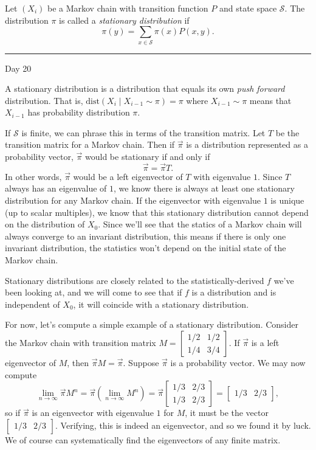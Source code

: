 \documentclass{problemset}
\newcommand{\mat}[1]{\begin{bmatrix}#1\end{bmatrix}}
\newcommand{\1}{\mathbf{1}}
\newcommand{\fatrule}[1]{\vspace{.3cm}\hrule {\hfill \sf #1}\par}
\begin{document}
	\begin{definition}
		Let $(X_i)$ be a Markov chain with transition function $P$ and state space $\mathcal S$.  The distribution $\pi$
		is called a \emph{stationary distribution} if
		\[
			\pi(y) = \sum_{x\in\mathcal S} \pi(x)P(x,y).
		\]
	\end{definition}

	\fatrule{Day 20}
	A stationary distribution is a distribution that equals its own \emph{push forward} distribution.
	That is, $\text{dist}(X_i\mid X_{i-1}\sim \pi) = \pi$ where $X_{i-1}\sim \pi$ means that $X_{i-1}$
	has probability distribution $\pi$.

	If $\mathcal S$ is finite, we can phrase this in terms of the transition matrix.  Let $T$ be the transition 
	matrix for a Markov chain.  Then if $\vec \pi$ is a distribution represented as a probability vector,
	$\vec\pi$ would be stationary if and only if
	\[
		\vec \pi = \vec \pi T.
	\]
	In other words, $\vec \pi$ would be a left eigenvector of $T$ with eigenvalue $1$.  Since $T$ always has
	an eigenvalue of $1$, we know there is always at least one stationary distribution for any Markov chain.
	If the eigenvector with eigenvalue $1$ is unique (up to scalar multiples), we know that this
	stationary distribution cannot depend on the distribution of $X_0$.  Since we'll
	see that the statics of a Markov chain will always converge to an invariant
	distribution, this means if there is only one invariant distribution, the statistics won't
	depend on the initial state of the Markov chain.

	Stationary distributions are closely related to the statistically-derived $f$
	we've been looking at, and we will come to see that if $f$ is a distribution 
	and is independent of $X_0$,
	it will coincide with a stationary distribution.

	For now, let's compute a simple example of a stationary distribution.  Consider
	the Markov chain with transition matrix $M=\mat{1/2&1/2\\1/4 & 3/4}$.  If $\vec \pi$
	is a left eigenvector of $M$, then $\vec \pi M=\vec \pi$.  Suppose $\vec \pi$ is
	a probability vector.  We may now compute 
	\[
		\lim_{n\to\infty} \vec \pi M^n = \vec \pi\left(\lim_{n\to\infty} M^n\right)
		=\vec \pi \mat{1/3 &2/3\\ 1/3&2/3} = \mat{1/3&2/3},
	\]
	so if $\vec \pi$ is an eigenvector with eigenvalue $1$ for $M$, it must be the vector $\mat{1/3&2/3}$.
	Verifying, this is indeed an eigenvector, and so we found it by luck.  We of course can systematically
	find the eigenvectors of any finite matrix.
\end{document}
